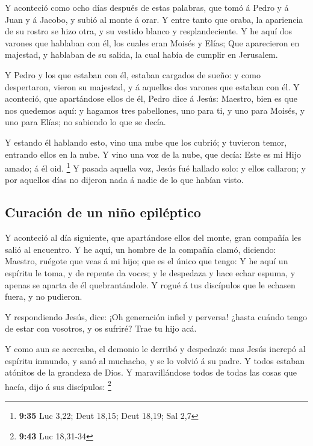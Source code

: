  Y aconteció como ocho días después de estas palabras,
que tomó á Pedro y á Juan y á Jacobo, y subió al monte á orar.
 Y entre tanto que oraba, la apariencia de su rostro se
hizo otra, y su vestido blanco y resplandeciente.  Y he
aquí dos varones que hablaban con él, los cuales eran Moisés y Elías;
 Que aparecieron en majestad, y hablaban de su salida, la
cual había de cumplir en Jerusalem.

 Y Pedro y los que estaban con él, estaban cargados de
sueño: y como despertaron, vieron su majestad, y á aquellos dos varones
que estaban con él.  Y aconteció, que apartándose ellos
de él, Pedro dice á Jesús: Maestro, bien es que nos quedemos aquí: y
hagamos tres pabellones, uno para ti, y uno para Moisés, y uno para
Elías; no sabiendo lo que se decía.

 Y estando él hablando esto, vino una nube que los
cubrió; y tuvieron temor, entrando ellos en la nube.  Y
vino una voz de la nube, que decía: Este es mi Hijo amado; á él oid.
\footnote{\textbf{9:35} Luc 3,22; Deut 18,15; Deut 18,19; Sal 2,7}
 Y pasada aquella voz, Jesús fué hallado solo: y ellos
callaron; y por aquellos días no dijeron nada á nadie de lo que habían
visto.

\hypertarget{curaciuxf3n-de-un-niuxf1o-epiluxe9ptico}{%
\subsection{Curación de un niño
epiléptico}\label{curaciuxf3n-de-un-niuxf1o-epiluxe9ptico}}

 Y aconteció al día siguiente, que apartándose ellos del
monte, gran compañía les salió al encuentro.  Y he aquí,
un hombre de la compañía clamó, diciendo: Maestro, ruégote que veas á mi
hijo; que es el único que tengo:  Y he aquí un espíritu
le toma, y de repente da voces; y le despedaza y hace echar espuma, y
apenas se aparta de él quebrantándole.  Y rogué á tus
discípulos que le echasen fuera, y no pudieron.

 Y respondiendo Jesús, dice: ¡Oh generación infiel y
perversa! ¿hasta cuándo tengo de estar con vosotros, y os sufriré? Trae
tu hijo acá.

 Y como aun se acercaba, el demonio le derribó y
despedazó: mas Jesús increpó al espíritu inmundo, y sanó al muchacho, y
se lo volvió á su padre.  Y todos estaban atónitos de la
grandeza de Dios. Y maravillándose todos de todas las cosas que hacía,
dijo á sus discípulos: \footnote{\textbf{9:43} Luc 18,31-34}

